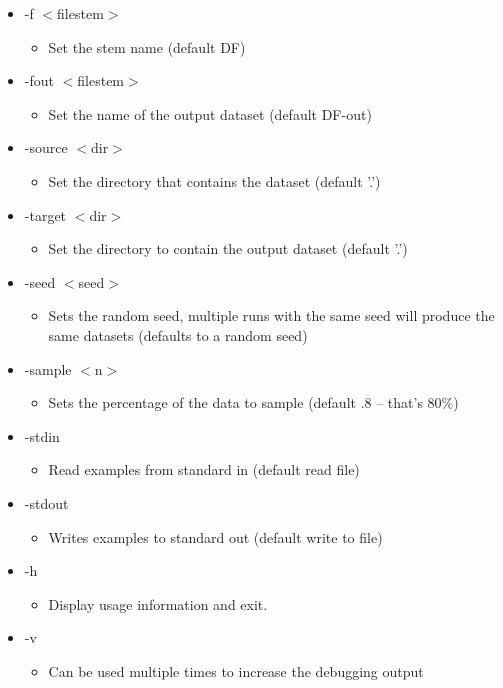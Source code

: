 \begin{itemize}
\item -f $<$filestem$>$\begin{itemize}
\item Set the stem name (default DF)\end{itemize}
\item -fout $<$filestem$>$\begin{itemize}
\item Set the name of the output dataset (default DF-out)\end{itemize}
\item -source $<$dir$>$\begin{itemize}
\item Set the directory that contains the dataset (default '.')\end{itemize}
\item -target $<$dir$>$\begin{itemize}
\item Set the directory to contain the output dataset (default '.')\end{itemize}
\item -seed $<$seed$>$\begin{itemize}
\item Sets the random seed, multiple runs with the same seed will produce the same datasets (defaults to a random seed)\end{itemize}
\item -sample $<$n$>$\begin{itemize}
\item Sets the percentage of the data to sample (default .8 -- that's 80\%)\end{itemize}
\item -stdin\begin{itemize}
\item Read examples from standard in (default read file)\end{itemize}
\item -stdout\begin{itemize}
\item Writes examples to standard out (default write to file)\end{itemize}
\item -h\begin{itemize}
\item Display usage information and exit.\end{itemize}
\item -v\begin{itemize}
\item Can be used multiple times to increase the debugging output\end{itemize}
\end{itemize}


